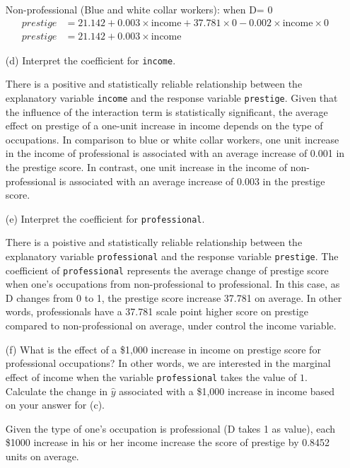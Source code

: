 \documentclass[12pt,letterpaper]{article}
\begin{document}
\begin{enumerate}
		\noindent Non-professional (Blue and white collar workers): when D= 0
	\begin{align*}
		prestige &= 21.142 + 0.003 \times \text{income} + 37.781\times 0 - 0.002\times \text{income}\times 0 \\
		prestige &= 21.142+ 0.003 \times \text{income} 
	\end{align*}
	
	\vspace{1cm}
	
	\item [(d)]
	Interpret the coefficient for \texttt{income}.

	\noindent  There is a positive and statistically reliable relationship between the explanatory variable  \texttt{income} and the response variable  \texttt{prestige}. 	
	Given that the influence of the interaction term is  statistically significant, the average effect on prestige of a one-unit increase in income depends on the type of occupations. In comparison to blue or white collar workers, one unit increase in the income of professional is associated with an average increase of 0.001 in the prestige score. In contrast, one unit increase in the income of non-professional is associated with an average increase of 0.003 in the prestige score.
	\vspace{10cm}	
	\item [(e)]
	Interpret the coefficient for \texttt{professional}.
		
	\noindent  There is a poistive and statistically reliable relationship between the explanatory variable  \texttt{professional} and the response variable  \texttt{prestige}. The coefficient of \texttt{professional}  represents the average change of prestige score when one's occupations from non-professional to professional. In this case, as D changes from 0 to 1, the prestige score increase 37.781 on average. In other words, 
	professionals have a 37.781 scale point higher score on prestige compared to non-professional on average, under control the income variable.
	
	\vspace{1cm}	
	\item [(f)]
	What is the effect of a \$1,000 increase in income on prestige score for professional occupations? In other words, we are interested in the marginal effect of income when the variable \texttt{professional} takes the value of $1$. Calculate the change in $\hat{y}$ associated with a \$1,000 increase in income based on your answer for (c).
		  
	\noindent Given the type of one's occupation is professional (D takes 1 as value),  each \$1000 increase in his or her income increase the score of prestige by 0.8452 units on average.
	\vspace{1cm}
	

\end{enumerate}
\end{document}
